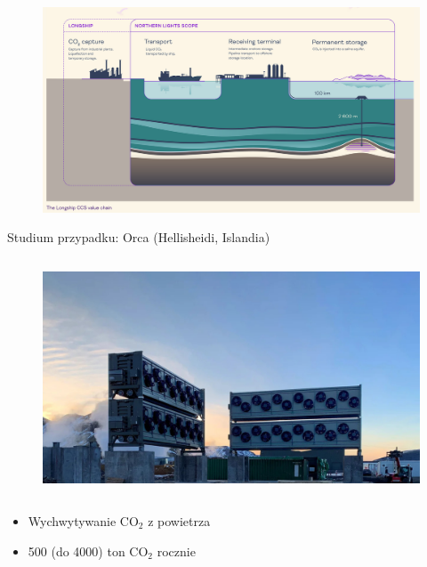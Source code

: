 \begin{frame}
    \begin{figure}
        \centering
        \includegraphics[width=1.0\textwidth, frame]{images/northern_lights_infographic.png}
    \end{figure}
\end{frame}

\begin{columnframe}{Studium przypadku: Orca (Hellisheidi, Islandia)}
    \begin{column}{0.5\textwidth}
        \begin{figure}
            \centering
            \includegraphics[width=1.0\textwidth, frame]{images/orca_iceland.jpg}
        \end{figure}
    \end{column}
    \begin{column}{0.5\textwidth}
        \begin{itemize}
            \item Wychwytywanie CO$_2$ z powietrza
            \item 500 (do 4000) ton CO$_2$ rocznie
        \end{itemize}
    \end{column}
\end{columnframe}


